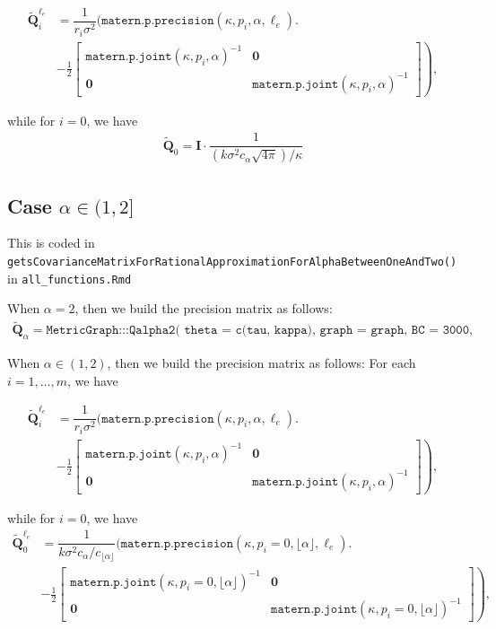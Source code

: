 \documentclass[11pt,a4paper]{article}
\theoremstyle{plain}
\theoremstyle{definition}
\begin{document}
\begin{align}
	\widetilde{\mathbf{Q}}_i^{\ell_e} & =\dfrac{1}{r_i\sigma^2}\bigg(\texttt{matern.p.precision}(\kappa,p_i,\alpha, \ell_e)\bigg.\\& - \left.\frac{1}{2}\begin{bmatrix}
       \texttt{matern.p.joint}(\kappa,p_i,\alpha)^{-1} & \mathbf{0} \\
        \mathbf{0} & \texttt{matern.p.joint}(\kappa,p_i,\alpha)^{-1}
    \end{bmatrix}\right),
\end{align}

while for $i=0$, we have    
\begin{align}
	\widetilde{\mathbf{Q}}_0 = \mathbf{I}\cdot \dfrac{1}{(k\sigma^2c_\alpha\sqrt{4\pi})/\kappa}
\end{align}
\subsection{Case $\alpha\in(1,2]$}

This is coded in \texttt{getsCovarianceMatrixForRationalApproximationForAlphaBetweenOneAndTwo()} in \texttt{all\_functions.Rmd}

When $\alpha=2$, then we build the precision matrix as follows:
\begin{align*}
    \widetilde{\mathbf{Q}}_\alpha = \texttt{MetricGraph:::Qalpha2(
      theta = c(tau, kappa),
      graph = graph,
      BC = 3000,
      build = TRUE)}
\end{align*}

When $\alpha\in(1,2)$, then we build the precision matrix as follows: For each $i=1,\ldots,m$, we have

\begin{align}
	\widetilde{\mathbf{Q}}_i^{\ell_e} & =\dfrac{1}{r_i\sigma^2}\bigg(\texttt{matern.p.precision}(\kappa,p_i,\alpha, \ell_e)\bigg.\\& - \left.\frac{1}{2}\begin{bmatrix}
       \texttt{matern.p.joint}(\kappa,p_i,\alpha)^{-1} & \mathbf{0} \\
        \mathbf{0} & \texttt{matern.p.joint}(\kappa,p_i,\alpha)^{-1}
    \end{bmatrix}\right),
\end{align}

while for $i=0$, we have    
\begin{align}
	\widetilde{\mathbf{Q}}_0^{\ell_e}  &=\dfrac{1}{k\sigma^2c_\alpha/c_{\lfloor\alpha\rfloor}}\bigg(\texttt{matern.p.precision}(\kappa,p_i=0,\lfloor\alpha\rfloor, \ell_e)\bigg.\\& - \left.\frac{1}{2}\begin{bmatrix}
       \texttt{matern.p.joint}(\kappa,p_i=0,\lfloor\alpha\rfloor)^{-1} & \mathbf{0} \\
        \mathbf{0} & \texttt{matern.p.joint}(\kappa,p_i=0,\lfloor\alpha\rfloor)^{-1}
    \end{bmatrix}\right),
\end{align}
\end{document}
